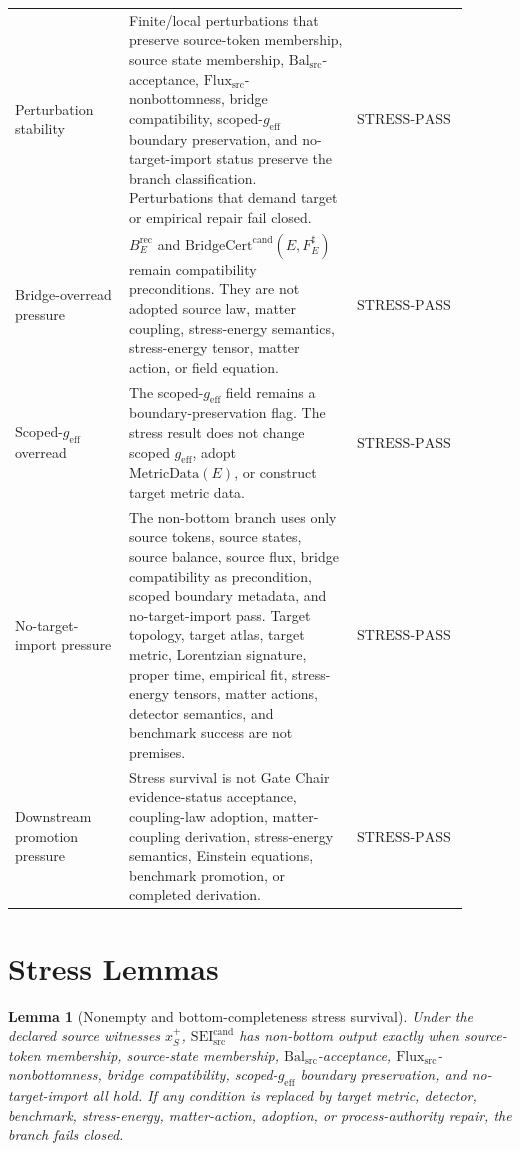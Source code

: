 \documentclass[11pt]{article}
\newcommand{\MetricData}{\mathrm{MetricData}}
\newcommand{\geff}{g_{\mathrm{eff}}}
\newcommand{\SEICand}{\mathrm{SEI}_{\mathrm{src}}^{\mathrm{cand}}}
\newcommand{\BErec}{B_E^{\mathrm{rec}}}
\newcommand{\BridgeCertCand}{\mathrm{BridgeCert}^{\mathrm{cand}}}
\newcommand{\BalSrc}{\mathrm{Bal}_{\mathrm{src}}}
\newcommand{\FluxSrc}{\mathrm{Flux}_{\mathrm{src}}}
\newcommand{\StressPass}{\mathrm{STRESS}\mbox{-}\mathrm{PASS}}
\newtheorem{lemma}{Lemma}
\begin{document}
\begin{longtable}{p{0.24\linewidth}p{0.48\linewidth}p{0.18\linewidth}}
Perturbation stability &
Finite/local perturbations that preserve source-token membership, source
state membership, \(\BalSrc\)-acceptance, \(\FluxSrc\)-nonbottomness, bridge
compatibility, scoped-\(\geff\) boundary preservation, and no-target-import
status preserve the branch classification. Perturbations that demand target
or empirical repair fail closed. & \(\StressPass\) \\
\addlinespace
Bridge-overread pressure &
\(\BErec\) and \(\BridgeCertCand(E,F_E^\sharp)\) remain compatibility
preconditions. They are not adopted source law, matter coupling,
stress-energy semantics, stress-energy tensor, matter action, or field
equation. & \(\StressPass\) \\
\addlinespace
Scoped-\(\geff\) overread &
The scoped-\(\geff\) field remains a boundary-preservation flag. The stress
result does not change scoped \(\geff\), adopt \(\MetricData(E)\), or
construct target metric data. & \(\StressPass\) \\
\addlinespace
No-target-import pressure &
The non-bottom branch uses only source tokens, source states, source balance,
source flux, bridge compatibility as precondition, scoped boundary metadata,
and no-target-import pass. Target topology, target atlas, target metric,
Lorentzian signature, proper time, empirical fit, stress-energy tensors,
matter actions, detector semantics, and benchmark success are not premises.
& \(\StressPass\) \\
\addlinespace
Downstream promotion pressure &
Stress survival is not Gate Chair evidence-status acceptance, coupling-law
adoption, matter-coupling derivation, stress-energy semantics, Einstein
equations, benchmark promotion, or completed derivation. & \(\StressPass\) \\
\bottomrule
\end{longtable}

\section{Stress Lemmas}

\begin{lemma}[Nonempty and bottom-completeness stress survival]
Under the declared source witnesses \(x_S^+\), \(\SEICand\) has non-bottom
output exactly when source-token membership, source-state membership,
\(\BalSrc\)-acceptance, \(\FluxSrc\)-nonbottomness, bridge compatibility,
scoped-\(\geff\) boundary preservation, and no-target-import all hold. If any
condition is replaced by target metric, detector, benchmark, stress-energy,
matter-action, adoption, or process-authority repair, the branch fails closed.
\end{lemma}
\end{document}
